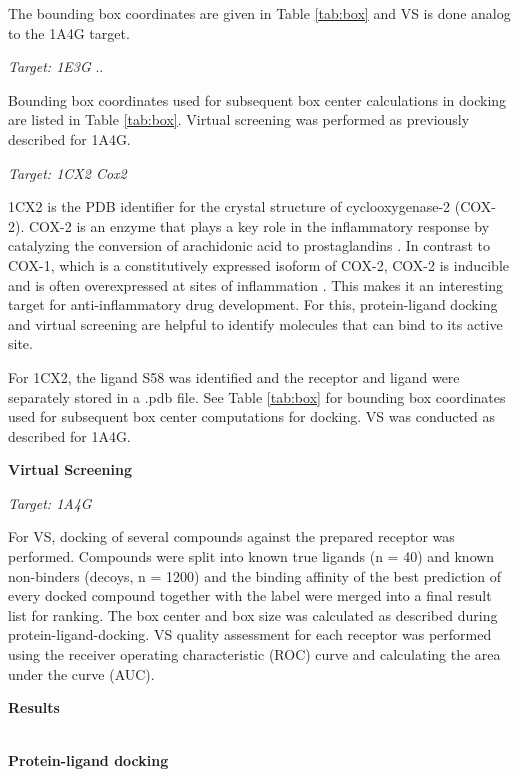 \documentclass[a4paper,10pt]{article}
\begin{document}
The bounding box coordinates are given in Table \ref{tab:box} and VS is done analog to the 1A4G target.

\textit{Target: 1E3G}
..

Bounding box coordinates used for subsequent box center calculations in docking are listed in Table \ref{tab:box}. Virtual screening was performed as previously described for 1A4G.

\textit{Target: 1CX2 Cox2}

1CX2 is the PDB identifier for the crystal structure of cyclooxygenase-2 (COX-2). COX-2 is an enzyme that plays a key role in the inflammatory response by catalyzing the conversion of arachidonic acid to prostaglandins \cite{1CX2}. In contrast to COX-1, which is a constitutively expressed isoform of COX-2, COX-2 is inducible and is often overexpressed at sites of inflammation \cite{1CX2_2}. This makes it an interesting target for anti-inflammatory drug development. For this, protein-ligand docking and virtual screening are helpful to identify molecules that can bind to its active site. 

For 1CX2, the ligand S58 was identified and the receptor and ligand were separately stored in a .pdb file. See Table \ref{tab:box} for bounding box coordinates used for subsequent box center computations for docking. VS was conducted as described for 1A4G.





\textbf{Virtual Screening}

\textit{Target: 1A4G}

For VS, docking of several compounds against the prepared receptor was performed. Compounds were split into known true ligands (n = 40) and known non-binders (decoys, n = 1200) and the binding affinity of the best prediction of every docked compound together with the label were merged into a final result list for ranking. The box center and box size was calculated as described during protein-ligand-docking.
VS quality assessment for each receptor was performed using the receiver operating characteristic (ROC) curve and calculating the area under the curve (AUC).


\begin{large}
	\vspace{0.5cm}
	\textbf{Results}
\end{large}	\\ [1mm]

\textbf{Protein-ligand docking}
\end{document}
